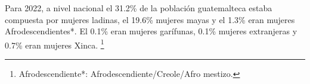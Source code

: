 Para 2022, a nivel nacional el 31.2\% de la población guatemalteca estaba compuesta por mujeres ladinas, el 19.6\% mujeres mayas y el 1.3\% eran mujeres Afrodescendientes*. El 0.1\% eran mujeres garífunas, 0.1\% mujeres extranjeras y 0.7\% eran mujeres Xinca. \footnote{Afrodescendiente*: Afrodescendiente/Creole/Afro mestizo.}